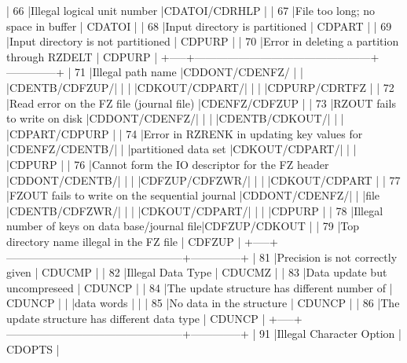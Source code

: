 \begin{XMP}
 |  66 |Illegal logical unit number                     |CDATOI/CDRHLP |
 |  67 |File too long; no space in buffer               |   CDATOI     |
 |  68 |Input directory is partitioned                  |   CDPART     |
 |  69 |Input directory is not partitioned              |   CDPURP     |
 |  70 |Error in deleting a partition through RZDELT    |   CDPURP     |
 +-----+------------------------------------------------+--------------+
 |  71 |Illegal path name                               |CDDONT/CDENFZ/
 |     |                                                |CDENTB/CDFZUP/|
 |     |                                                |CDKOUT/CDPART/|
 |     |                                                |CDPURP/CDRTFZ |
 |  72 |Read error on the FZ file (journal file)        |CDENFZ/CDFZUP |
 |  73 |RZOUT fails to write on disk                    |CDDONT/CDENFZ/|
 |     |                                                |CDENTB/CDKOUT/|
 |     |                                                |CDPART/CDPURP |
 |  74 |Error in RZRENK in updating key values for      |CDENFZ/CDENTB/|
 |     |partitioned data set                            |CDKOUT/CDPART/|
 |     |                                                |CDPURP        |
 |  76 |Cannot form the IO descriptor for the FZ header |CDDONT/CDENTB/|
 |     |                                                |CDFZUP/CDFZWR/|
 |     |                                                |CDKOUT/CDPART |
 |  77 |FZOUT fails to write on the sequential journal  |CDDONT/CDENFZ/|
 |     |file                                            |CDENTB/CDFZWR/|
 |     |                                                |CDKOUT/CDPART/|
 |     |                                                |CDPURP        |
 |  78 |Illegal number of keys on data base/journal file|CDFZUP/CDKOUT |
 |  79 |Top directory name illegal in the FZ file       |   CDFZUP     |
 +-----+------------------------------------------------+--------------+
 |  81 |Precision is not correctly given                |   CDUCMP     |
 |  82 |Illegal Data Type                               |   CDUCMZ     |
 |  83 |Data update but uncompreseed                    |   CDUNCP     |
 |  84 |The update structure has different number of    |   CDUNCP     |
 |     |data words                                      |              |
 |  85 |No data in the structure                        |   CDUNCP     |
 |  86 |The update structure has different data type    |   CDUNCP     |
 +-----+------------------------------------------------+--------------+
 |  91 |Illegal Character Option                        |   CDOPTS     |

\end{XMP}
